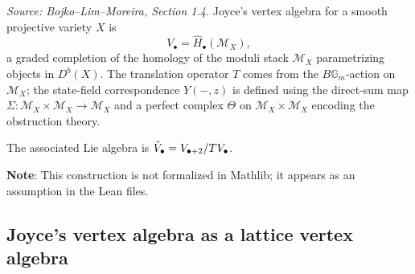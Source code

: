 
\begin{definition}[JoyceVertexAlgebra]
  \label{def:joyce-vertex-algebra}
  \textit{Source: Bojko--Lim--Moreira, Section 1.4.}
  Joyce's vertex algebra for a smooth projective variety \(X\) is
  \[V_\bullet = \widehat{H}_\bullet(\mathcal{M}_X),\]
  a graded completion of the homology of the moduli stack \(\mathcal{M}_X\)
  parametrizing objects in \(D^b(X)\). The translation operator \(T\) comes from
  the \(B\mathbb{G}_m\)-action on \(\mathcal{M}_X\); the state-field correspondence
  \(Y(-,z)\) is defined using the direct-sum map
  \(\Sigma \colon \mathcal{M}_X \times \mathcal{M}_X \to \mathcal{M}_X\)
  and a perfect complex \(\Theta\) on \(\mathcal{M}_X \times \mathcal{M}_X\)
  encoding the obstruction theory.

  The associated Lie algebra is \(\widecheck{V}_\bullet = V_{\bullet+2}/TV_\bullet\).

  \textbf{Note}: This construction is not formalized in Mathlib; it appears as an
  assumption in the Lean files.
\end{definition}

\subsection{Joyce's vertex algebra as a lattice vertex algebra}


